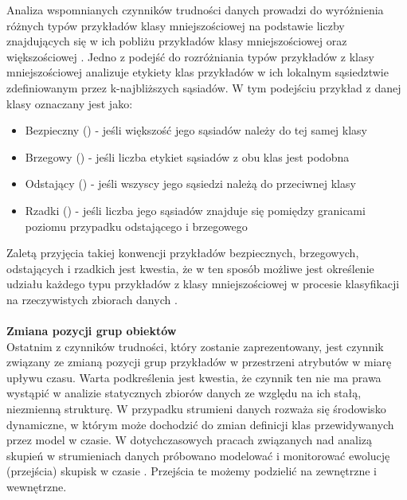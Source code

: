 \noindent Analiza wspomnianych czynników trudności danych prowadzi do wyróżnienia różnych typów przykładów klasy mniejszościowej na podstawie liczby znajdujących się w ich pobliżu przykładów klasy mniejszościowej oraz większościowej \cite{Article:DataDistribution3}. Jedno z podejść do rozróżniania typów przykładów z klasy mniejszościowej \cite{Article:DataDistribution3}\cite{Article:DataDistribution2} analizuje etykiety klas przykładów w ich lokalnym sąsiedztwie zdefiniowanym przez k-najbliższych sąsiadów. W tym podejściu przykład z danej klasy oznaczany jest jako:

\begin{itemize}
    \item Bezpieczny () - jeśli większość jego sąsiadów należy do tej samej klasy
    \item Brzegowy () - jeśli liczba etykiet sąsiadów z obu klas jest podobna
    \item Odstający () - jeśli wszyscy jego sąsiedzi należą do przeciwnej klasy
    \item Rzadki () - jeśli liczba jego sąsiadów znajduje się pomiędzy granicami poziomu przypadku odstającego i brzegowego
\end{itemize}

\noindent Zaletą przyjęcia takiej konwencji przykładów bezpiecznych, brzegowych, odstających i rzadkich jest kwestia, że w ten sposób możliwe jest określenie udziału każdego typu przykładów z klasy mniejszościowej w procesie klasyfikacji na rzeczywistych zbiorach danych \cite{Article:TypyPrzykladow}\cite{Article:DataDistribution3}\cite{Article:DataDistribution2}.\\\\
\textbf{Zmiana pozycji grup obiektów}\\

\noindent Ostatnim z czynników trudności, który zostanie zaprezentowany, jest czynnik związany ze zmianą pozycji grup przykładów w przestrzeni atrybutów w miarę upływu czasu. Warta podkreślenia jest kwestia, że czynnik ten nie ma prawa wystąpić w analizie statycznych zbiorów danych ze względu na ich stałą, niezmienną strukturę. W przypadku strumieni danych rozważa się środowisko dynamiczne, w którym może dochodzić do zmian definicji klas przewidywanych przez model w czasie. W dotychczasowych pracach związanych nad analizą skupień w strumieniach danych próbowano modelować i monitorować ewolucję (przejścia) skupisk w czasie \cite{Article:ClusterTransition}. Przejścia te możemy podzielić na zewnętrzne i wewnętrzne.

